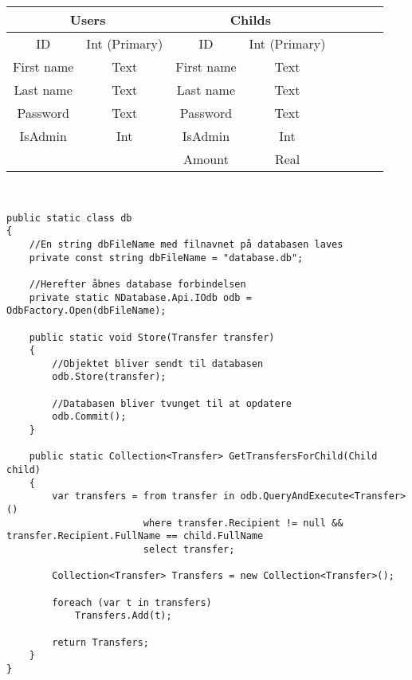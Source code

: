\begin{tabular}{||c|c||c|c||c|c||c|c}
\hline 
\multicolumn{2}{||c||}{Users} & \multicolumn{2}{c||}{Childs}\\
\hline
ID & Int (Primary) & ID & Int (Primary) \\ 
\hline 
First name & Text & First name & Text \\ 
\hline 
Last name & Text & Last name & Text \\ 
\hline 
Password & Text & Password & Text \\ 
\hline 
IsAdmin & Int & IsAdmin & Int \\ 
\hline 
 &  & Amount & Real \\ 
\hline 
\end{tabular}
\\
\begin{lstlisting}[caption={Uddrag af filen "db.cs" fra kildekoden til programmet},label={lst:db}]
public static class db
{
	//En string dbFileName med filnavnet på databasen laves
	private const string dbFileName = "database.db";
	
	//Herefter åbnes database forbindelsen
	private static NDatabase.Api.IOdb odb = OdbFactory.Open(dbFileName);

	public static void Store(Transfer transfer)
	{
		//Objektet bliver sendt til databasen
		odb.Store(transfer);
		
		//Databasen bliver tvunget til at opdatere
		odb.Commit();
	}
	
	public static Collection<Transfer> GetTransfersForChild(Child child)
	{
		var transfers = from transfer in odb.QueryAndExecute<Transfer>()
						where transfer.Recipient != null && transfer.Recipient.FullName == child.FullName
						select transfer;

		Collection<Transfer> Transfers = new Collection<Transfer>();

		foreach (var t in transfers)
			Transfers.Add(t);

		return Transfers;
	}
}
\end{lstlisting}

